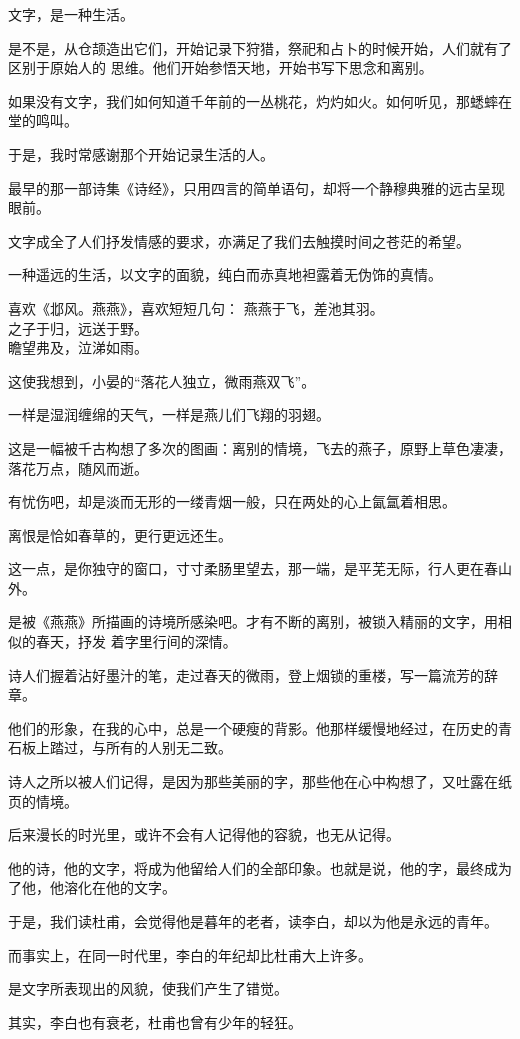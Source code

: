\documentclass[12pt,a4paper]{article}
\def\blankrev{\vspace{1ex}}									%
\begin{document}
	\endwriting



		文字，是一种生活。

		是不是，从仓颉造出它们，开始记录下狩猎，祭祀和占卜的时候开始，人们就有了区别于原始人的
	思维。他们开始参悟天地，开始书写下思念和离别。

		如果没有文字，我们如何知道千年前的一丛桃花，灼灼如火。如何听见，那蟋蟀在堂的鸣叫。\par
		于是，我时常感谢那个开始记录生活的人。\par
		最早的那一部诗集《诗经》，只用四言的简单语句，却将一个静穆典雅的远古呈现眼前。

		文字成全了人们抒发情感的要求，亦满足了我们去触摸时间之苍茫的希望。\par
		一种遥远的生活，以文字的面貌，纯白而赤真地袒露着无伪饰的真情。

		喜欢《邶风。燕燕》，喜欢短短几句：
		\shortpoem{}{}{}
		燕燕于飞，差池其羽。\\
		之子于归，远送于野。\\
		瞻望弗及，泣涕如雨。\\
		\endshortpoem

		这使我想到，小晏的“落花人独立，微雨燕双飞”。\par
		一样是湿润缠绵的天气，一样是燕儿们飞翔的羽翅。\par
		这是一幅被千古构想了多次的图画：离别的情境，飞去的燕子，原野上草色凄凄，落花万点，随风而逝。\par
		有忧伤吧，却是淡而无形的一缕青烟一般，只在两处的心上氤氲着相思。\par
		离恨是恰如春草的，更行更远还生。\par
		这一点，是你独守的窗口，寸寸柔肠里望去，那一端，是平芜无际，行人更在春山外。

		是被《燕燕》所描画的诗境所感染吧。才有不断的离别，被锁入精丽的文字，用相似的春天，抒发
	着字里行间的深情。

		\blankrev
		诗人们握着沾好墨汁的笔，走过春天的微雨，登上烟锁的重楼，写一篇流芳的辞章。\par
		他们的形象，在我的心中，总是一个硬瘦的背影。他那样缓慢地经过，在历史的青石板上踏过，与所有的人别无二致。\par
		诗人之所以被人们记得，是因为那些美丽的字，那些他在心中构想了，又吐露在纸页的情境。\par
		后来漫长的时光里，或许不会有人记得他的容貌，也无从记得。\par
		他的诗，他的文字，将成为他留给人们的全部印象。也就是说，他的字，最终成为了他，他溶化在他的文字。\par
		于是，我们读杜甫，会觉得他是暮年的老者，读李白，却以为他是永远的青年。\par
		而事实上，在同一时代里，李白的年纪却比杜甫大上许多。\par
		是文字所表现出的风貌，使我们产生了错觉。\par
		其实，李白也有衰老，杜甫也曾有少年的轻狂。
\end{document}
